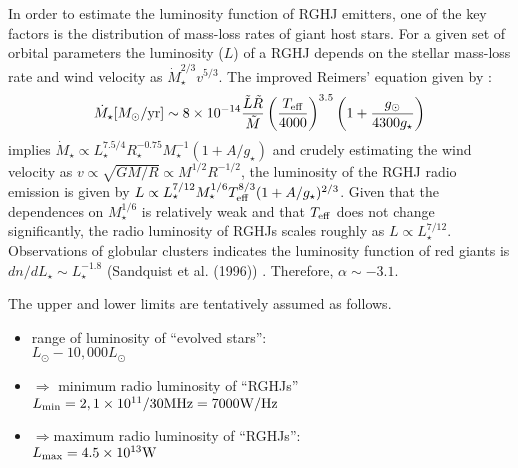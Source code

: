 \documentclass[iop,numberedappendix,apj,twocolappendix,]{emulateapj}
\begin{document}
In order to estimate the luminosity function of RGHJ emitters, one of the key factors is the distribution of mass-loss rates of giant host stars. 
For a given set of orbital parameters the luminosity ($L$) of a RGHJ depends on the stellar mass-loss rate and wind velocity as $\dot{M}_\star^{2/3} v^{5/3}$. 
The improved Reimers' equation \citep{reimers1975} given by \citet{schroder2005,schroder2007}:
\begin{equation}
\dot M_\star [M_\odot{\rm /yr}] \sim 8 \times 10^{-14} \frac{\tilde L \tilde R}{\tilde M} \left( \frac{T_{\rm eff}}{4000} \right)^{3.5} \left( 1 + \frac{g_{\odot }}{4300 g_{\star}} \right) \label{eq:mass-loss}
\end{equation}
implies $\dot{M}_\star \propto L_\star^{7.5/4} R_\star^{-0.75} M_\star^{-1} (1+A/g_\star)$ and crudely estimating the wind velocity as $v \propto \sqrt{GM/R} \propto M^{1/2} R^{-1/2}$, the luminosity of the RGHJ radio emission is given by $L \propto L_\star^{7/12} M_\star^{1/6} T_{\rm eff}^{8/3} (1+A/g_\star)^{2/3}$. 
Given that the dependences on $M_\star^{1/6}$ is relatively weak and that $T_{\rm eff}$ does not change significantly, the radio luminosity of RGHJs scales roughly as $L \propto L_{\star }^{7/12}$. 
Observations of globular clusters indicates the luminosity function of red giants is $dn/dL_{\star } \sim L_{\star }^{-1.8}$ (Sandquist et al. (1996)) %
. Therefore, $\alpha \sim -3.1$. 

The upper and lower limits are tentatively assumed as follows. 
\begin{itemize}
\item range of luminosity of ``evolved stars'':\\$L_{\odot }-10,000 L_{\odot }$
\item $\Rightarrow$ minimum radio luminosity of ``RGHJs''\\%
$L_{\rm min} = 2,1\times 10^{11}/30 {\rm MHz} = 7000 {\rm W/Hz}$
\item $\Rightarrow $maximum radio luminosity of ``RGHJs'':\\$L_{\rm max} = 4.5\times 10^{13} {\rm W}$
\end{itemize}


\end{document}
